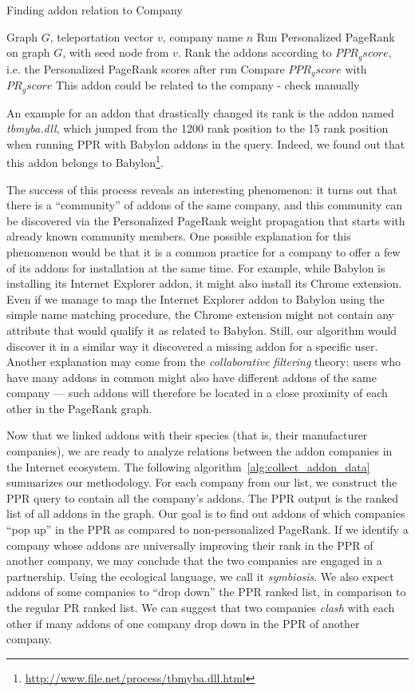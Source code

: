 \documentclass[11pt,oneside]{book}
\begin{document}
\begin{algorithm}[!t]
\caption{Finding addon relation to Company}
\label{alg:find_addon_species}
\begin{algorithmic}[1] 
\REQUIRE Graph $G$, teleportation vector $v$, company name $n$
\STATE Run Personalized PageRank on graph $G$, with seed node from $v$.
\STATE Rank the addons according to $PPR_gscore$, i.e. the Personalized PageRank scores after run
\STATE Compare $PPR_gscore$ with $PR_gscore$
\STATE This addon could be related to the company - check manually
\ENDIF
\ENDFOR
\end{algorithmic}
\end{algorithm}

An example for an addon that drastically changed its rank is the addon named \emph{tbmyba.dll}, which jumped from the 1200 rank position to the 15 rank position when running PPR with Babylon addons in the query. Indeed, we found out that this addon belongs to Babylon\footnote{\url{http://www.file.net/process/tbmyba.dll.html}}.

The success of this process reveals an interesting phenomenon: it turns out that there is a ``community'' of addons of the same company, and this community can be discovered via the Personalized PageRank weight propagation that starts with already known community members. One possible explanation for this phenomenon would be that it is a common practice for a company to offer a few of its addons for installation at the same time. For example, while Babylon is installing its Internet Explorer addon, it might also install its Chrome extension. Even if we manage to map the Internet Explorer addon to Babylon using the simple name matching procedure, the Chrome extension might not contain any attribute that would qualify it as related to Babylon. Still, our algorithm would discover it in a similar way it discovered a missing addon for a specific user. 
Another explanation may come from the \emph{collaborative filtering} theory: users who have many addons in common might also have different addons of the same company --- such addons will therefore be located in a close proximity of each other in the PageRank graph.

Now that we linked addons with their species (that is, their manufacturer companies), we are ready to analyze relations between the addon companies in the Internet ecosystem. The following algorithm~\autoref{alg:collect_addon_data} summarizes our methodology. 
For each company from our list, we construct the PPR query to contain all the company's addons. The PPR output is the ranked list of all addons in the graph. Our goal is to find out addons of which companies ``pop up'' in the PPR as compared to non-personalized PageRank. If we identify a company whose addons are universally improving their rank in the PPR of another company, we may conclude that the two companies are engaged in a partnership. Using the ecological language, we call it \emph{symbiosis}. We also expect addons of some companies to ``drop down'' the PPR ranked list, in comparison to the regular PR ranked list. We can suggest that two companies \emph{clash} with each other if many addons of one company drop down in the PPR of another company.
\end{document}
